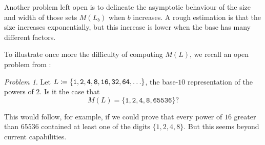 \documentclass[12pt]{article}
\theoremstyle{plain}
\theoremstyle{definition}
\theoremstyle{remark}
\newtheorem{problem}[theorem]{Problem}
\newcommand{\0}{\mathtt{0}}
\newcommand{\1}{\mathtt{1}}
\newcommand{\2}{\mathtt{2}}
\newcommand{\3}{\mathtt{3}}
\newcommand{\4}{\mathtt{4}}
\newcommand{\5}{\mathtt{5}}
\newcommand{\6}{\mathtt{6}}
\newcommand{\7}{\mathtt{7}}
\newcommand{\8}{\mathtt{8}}
\newcommand{\9}{\mathtt{9}}
\begin{document}
Another problem left open is to delineate the asymptotic behaviour of the size and width of those sets $M(L_b)$ when $b$ increases.
A rough estimation is that the size increases exponentially, but this increase is lower when the base has many different factors.

To illustrate once more the difficulty of computing $M(L)$, we recall
an open problem from \cite{Sh00}:

\begin{problem} 
Let $L \coloneqq \lbrace {\tt 1, 2, 4, 8, 16, 32, 64, } \ldots \rbrace$, the
base-$10$ representation of the powers of $2$.  
Is it the case that
$$ M(L) = \lbrace \1, \2, \4, \8, \6\5\5\3\6 \rbrace ? $$
\end{problem}

This would follow, for example, if we could prove that every power
of $16$ greater than $65536$ contained at least one of the digits
$\lbrace 1,2,4, 8 \rbrace$.  But this seems beyond current capabilities.
\end{document}
